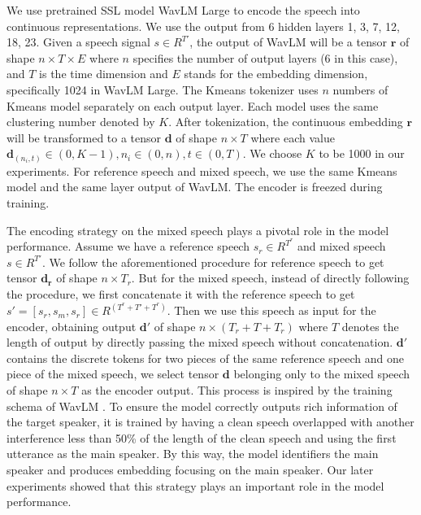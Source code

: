 \documentclass[conference]{IEEEtran}
\begin{document}
We use pretrained SSL model WavLM Large \cite{wavlm} to 
encode the speech into continuous representations. We use the output from 6 hidden 
layers 1, 3, 7, 12, 18, 23. Given a speech signal \(s \in R^{T'} \), the output 
of WavLM will be a tensor \(\bm{r}\) of shape \(n \times T \times E\) where 
\(n\) specifies the number 
of output layers (6 in this case), and  \(T\) is the time 
dimension and \(E\) stands for the 
embedding dimension, specifically 1024 in WavLM Large. The Kmeans tokenizer uses \(n\) numbers of  Kmeans model 
separately on each output layer. Each model uses the same clustering number denoted by \(K\).
After tokenization, the continuous embedding \(\bm{r}\) will be transformed to a tensor \(\bm{d}\) of shape \(n \times T\) where each value \(\bm{d}_{(n_i,t)} \in (0, K-1), n_i \in (0,n), t \in 
(0, T)\). We choose \(K\) to be 1000 in our experiments. For reference speech and mixed speech, we 
use the same Kmeans model and the same layer output of WavLM. The encoder is freezed during training.

The encoding strategy on the mixed speech plays a pivotal role in the model performance. Assume we 
have a reference speech \(s_r \in R^{T^r} \) and mixed speech \(s \in R^{T'}\). 
We follow the 
aforementioned procedure for 
reference speech to get tensor \(\bm{d_r}\) of shape \(n \times T_r\). But for the mixed 
speech, instead of directly following the procedure, we first concatenate it with 
the reference speech to get \(s' = [s_r, s_m, s_r] \in R^{(T^r+T'+T^r)}\). Then we use this speech 
as input for the encoder, obtaining output \(\bm{d'}\) of shape \(n \times (T_r+T+T_r)\) where \(T\) 
denotes the length of output by directly passing the mixed speech without concatenation. \(\bm{d'}\) 
contains the discrete tokens for two pieces of the same reference speech and one piece of the mixed 
speech, we select tensor \(\bm{d}\) belonging only to the mixed speech of shape \(n\times T\) as the 
encoder output. This process is inspired by the training schema of WavLM \cite{wavlm}. To ensure the 
model correctly outputs rich information of the target speaker, it is trained by 
having a clean speech overlapped with another interference less than 50\% of the length of the clean 
speech and using the first utterance as the main speaker. By this way, the model identifiers the 
main speaker and produces embedding focusing on the main speaker. Our later experiments showed that 
this strategy plays an important role in the model performance. 
\end{document}
